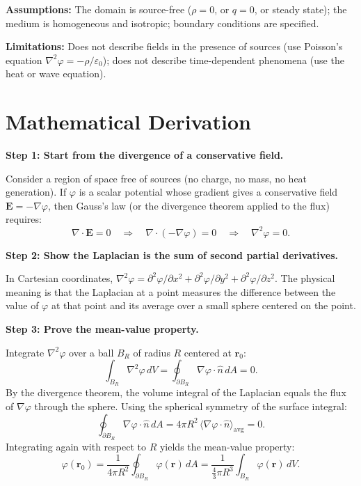 \textbf{Assumptions:} The domain is source-free ($\rho = 0$, or $q = 0$, or steady state); the medium is homogeneous and isotropic; boundary conditions are specified.


\textbf{Limitations:} Does not describe fields in the presence of sources (use Poisson's equation $\nabla^{2}\varphi = -\rho/\varepsilon_{0}$); does not describe time-dependent phenomena (use the heat or wave equation).


\section*{Mathematical Derivation}

\textbf{Step 1: Start from the divergence of a conservative field.}

Consider a region of space free of sources (no charge, no mass, no heat generation). If $\varphi$ is a scalar potential whose gradient gives a conservative field $\mathbf{E} = -\nabla\varphi$, then Gauss's law (or the divergence theorem applied to the flux) requires:
\begin{equation}
\nabla\cdot\mathbf{E} = 0 \quad\Longrightarrow\quad \nabla\cdot(-\nabla\varphi) = 0 \quad\Longrightarrow\quad \nabla^{2}\varphi = 0.
\end{equation}

\textbf{Step 2: Show the Laplacian is the sum of second partial derivatives.}

In Cartesian coordinates, $\nabla^{2}\varphi = \partial^{2}\varphi/\partial x^{2} + \partial^{2}\varphi/\partial y^{2} + \partial^{2}\varphi/\partial z^{2}$. The physical meaning is that the Laplacian at a point measures the difference between the value of $\varphi$ at that point and its average over a small sphere centered on the point.

\textbf{Step 3: Prove the mean-value property.}

Integrate $\nabla^{2}\varphi$ over a ball $B_R$ of radius $R$ centered at $\mathbf{r}_0$:
\begin{equation}
\int_{B_R} \nabla^{2}\varphi\,dV = \oint_{\partial B_R} \nabla\varphi\cdot\hat{n}\,dA = 0.
\end{equation}
By the divergence theorem, the volume integral of the Laplacian equals the flux of $\nabla\varphi$ through the sphere. Using the spherical symmetry of the surface integral:
\begin{equation}
\oint_{\partial B_R} \nabla\varphi\cdot\hat{n}\,dA = 4\pi R^{2}\,\langle\nabla\varphi\cdot\hat{n}\rangle_{\text{avg}} = 0.
\end{equation}
Integrating again with respect to $R$ yields the mean-value property:
\begin{equation}
\varphi(\mathbf{r}_0) = \frac{1}{4\pi R^{2}}\oint_{\partial B_R} \varphi(\mathbf{r})\,dA = \frac{1}{\frac{4}{3}\pi R^{3}}\int_{B_R} \varphi(\mathbf{r})\,dV.
\end{equation}

